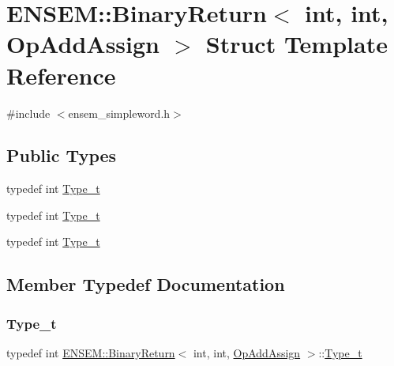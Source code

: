 \hypertarget{structENSEM_1_1BinaryReturn_3_01int_00_01int_00_01OpAddAssign_01_4}{}\section{E\+N\+S\+EM\+:\+:Binary\+Return$<$ int, int, Op\+Add\+Assign $>$ Struct Template Reference}
\label{structENSEM_1_1BinaryReturn_3_01int_00_01int_00_01OpAddAssign_01_4}


{\ttfamily \#include $<$ensem\+\_\+simpleword.\+h$>$}

\subsection*{Public Types}
\begin{DoxyCompactItemize}
\item 
typedef int \mbox{\hyperlink{structENSEM_1_1BinaryReturn_3_01int_00_01int_00_01OpAddAssign_01_4_a59ccfa49f2916c58be8fcfb51e252c15}{Type\+\_\+t}}
\item 
typedef int \mbox{\hyperlink{structENSEM_1_1BinaryReturn_3_01int_00_01int_00_01OpAddAssign_01_4_a59ccfa49f2916c58be8fcfb51e252c15}{Type\+\_\+t}}
\item 
typedef int \mbox{\hyperlink{structENSEM_1_1BinaryReturn_3_01int_00_01int_00_01OpAddAssign_01_4_a59ccfa49f2916c58be8fcfb51e252c15}{Type\+\_\+t}}
\end{DoxyCompactItemize}


\subsection{Member Typedef Documentation}
\mbox{\label{structENSEM_1_1BinaryReturn_3_01int_00_01int_00_01OpAddAssign_01_4_a59ccfa49f2916c58be8fcfb51e252c15}} 
\subsubsection{\texorpdfstring{Type\_t}{Type\_t}\hspace{0.1cm}{\footnotesize\ttfamily [1/3]}}
{\footnotesize\ttfamily typedef int \mbox{\hyperlink{structENSEM_1_1BinaryReturn}{E\+N\+S\+E\+M\+::\+Binary\+Return}}$<$ int, int, \mbox{\hyperlink{structENSEM_1_1OpAddAssign}{Op\+Add\+Assign}} $>$\+::\mbox{\hyperlink{structENSEM_1_1BinaryReturn_3_01int_00_01int_00_01OpAddAssign_01_4_a59ccfa49f2916c58be8fcfb51e252c15}{Type\+\_\+t}}}

